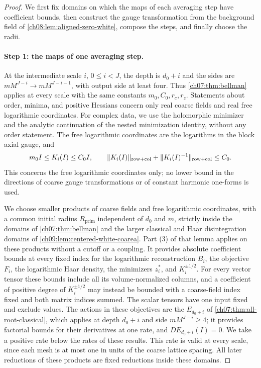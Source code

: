 \begin{proof}
We first fix domains on which the maps of each averaging step have coefficient bounds, then construct the gauge transformation from the background field of \cref{ch08:lem:aligned-zero-white}, compose the steps, and finally choose the radii.

\paragraph{Step 1: the maps of one averaging step.}
At the intermediate scale $i$, $0\le i<J$, the depth is $d_0+i$ and the sides are $mM^{J-i}\to mM^{J-i-1}$, with output side at least four. Thus \cref{ch07:thm:bellman} applies at every scale with the same constants $m_0,C_0,r_c,r_z$. Statements about order, minima, and positive Hessians concern only real coarse fields and real free logarithmic coordinates. For complex data, we use the holomorphic minimizer and the analytic continuation of the nested minimization identity, without any order statement. The free logarithmic coordinates are the logarithms in the block axial gauge, and
\[
 m_0I\le K_i(I)\le C_0I,\qquad \lVert K_i(I)\rVert_{\mathrm{row+col}}+\lVert K_i(I)^{-1}\rVert_{\mathrm{row+col}}\le C_0.
\]
This concerns the free logarithmic coordinates only; no lower bound in the directions of coarse gauge transformations or of constant harmonic one-forms is used.

We choose smaller products of coarse fields and free logarithmic coordinates, with a common initial radius $R_{\mathrm{prim}}$ independent of $d_0$ and $m$, strictly inside the domains of \cref{ch07:thm:bellman} and the larger classical and Haar disintegration domains of \cref{ch09:lem:centered-white-coarea}. Part (3) of that lemma applies on these products without a cutoff or a coupling. It provides absolute coefficient bounds at every fixed index for the logarithmic reconstruction $B_i$, the objective $F_i$, the logarithmic Haar density, the minimizers $z_i^*$, and $K_i^{\pm1/2}$. For every vector tensor these bounds include all its volume-normalized columns, and a coefficient of positive degree of $K_i^{\pm1/2}$ may instead be bounded with a coarse-field index fixed and both matrix indices summed. The scalar tensors have one input fixed and exclude values. The actions in these objectives are the $E_{d_0+i}$ of \cref{ch07:thm:all-root-classical}, which applies at depth $d_0+i$ and side $mM^{J-i}\ge4$; it provides factorial bounds for their derivatives at one rate, and $DE_{d_0+i}(I)=0$. We take a positive rate below the rates of these results. This rate is valid at every scale, since each mesh is at most one in units of the coarse lattice spacing. All later reductions of these products are fixed reductions inside these domains.


\end{proof}

